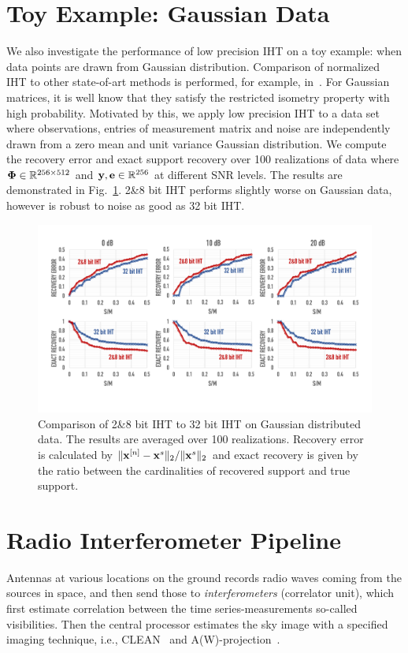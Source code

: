 \documentclass[aoas,preprint]{imsart}
\numberwithin{equation}{section}
\theoremstyle{plain}
\begin{document}
{\section{Toy Example: Gaussian Data}
We also investigate the performance of low precision IHT on a toy example: when data points are drawn from Gaussian distribution. Comparison of normalized IHT to other state-of-art methods is performed, for example, in~\cite{blumensath2010niht, blumensath2012greedy}. For Gaussian matrices, it is well know that they satisfy the restricted isometry property with high probability. Motivated by this, we apply low precision IHT to a data set where observations, entries of measurement matrix and noise are independently drawn from a zero mean and unit variance Gaussian distribution. We compute the recovery error and exact support recovery over 100 realizations of data where ${\bf \Phi} \in \mathbb{R}^{256\times 512}$ and ${\bf y}, {\bf e} \in \mathbb{R}^{256}$ at different SNR levels. The results are demonstrated in Fig.~\ref{fig:iht_on_gaussian}. 2\&8 bit IHT performs slightly worse on Gaussian data, however is robust to noise as good as 32 bit IHT.
\begin{figure}[t]
\centering
\includegraphics[width=1\columnwidth, angle=0]{figs/iht_on_gaussian.pdf}
\caption{Comparison of 2\&8 bit IHT to 32 bit IHT on Gaussian distributed data. The results are averaged over 100 realizations. Recovery error is calculated by $\| {\bf x}^{[n]} -{\bf x}^s \|_2/\|{\bf x}^s \|_2$ and exact recovery is given by the ratio between the cardinalities of recovered support and true support.}
\label{fig:iht_on_gaussian}
\vspace{-1em}
\end{figure}

\section{Radio Interferometer Pipeline}\label{sec:astronomy}
Antennas at various locations on the ground records radio waves coming from the sources in space, and then send those to {\it interferometers} (correlator unit), which first estimate correlation between the time series-measurements so-called visibilities. Then the central processor estimates the sky image with a specified imaging technique, i.e., {CLEAN}~\cite{hogbom1974clean} and A(W)-projection~\cite{bhatganar2008ra}. 
}
\end{document}
